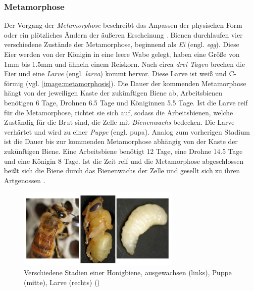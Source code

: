 \subsubsection{Metamorphose}
Der Vorgang der \textit{Metamorphose} beschreibt das Anpassen der physischen Form oder ein plötzliches Ändern der äußeren Erscheinung \cite*[]{bees:metamorphosisdefinition}. Bienen durchlaufen vier verschiedene Zustände der Metamorphose, beginnend als \textit{Ei} (engl. \textit{egg}). Diese Eier werden von der Königin in eine leere Wabe gelegt, haben eine Größe von 1mm bis 1.5mm und ähneln einem Reiskorn. Nach circa \textit{drei Tagen} brechen die Eier und eine \textit{Larve} (engl. \textit{larva}) kommt hervor. Diese Larve ist weiß und C-förmig (vgl. \autoref{image:metamorphosis}). Die Dauer der kommenden Metamorphose hängt von der jeweiligen Kaste der zukünftigen Biene ab, Arbeitsbienen benötigen 6 Tage, Drohnen 6.5 Tage und Königinnen 5.5 Tage. Ist die Larve reif für die Metamorphose, richtet sie sich auf, sodass die Arbeitsbienen, welche Zuständig für die Brut sind, die Zelle mit \textit{Bienenwachs} bedecken. Die Larve verhärtet und wird zu einer \textit{Puppe} (engl. pupa). Analog zum vorherigen Stadium ist die Dauer bis zur kommenden Metamorphose abhängig von der Kaste der zukünftigen Biene. Eine Arbeitsbiene benötigt 12 Tage, eine Drohne 14.5 Tage und eine Königin 8 Tage. Ist die Zeit reif und die Metamorphose abgeschlossen beißt sich die Biene durch das Bienenwachs der Zelle und gesellt sich zu ihren Artgenossen \cite*[]{bees:name}.


\begin{figure}
    \begin{center}
        \includegraphics[width=300px]{0.bilder/metamorphosis.jpg}
    \end{center}
    \caption{Verschiedene Stadien einer Honigbiene, ausgewachsen (links), Puppe (mitte), Larve (rechts) (\cite[]{bees:name})} \label{image:metamorphosis}
\end{figure}

